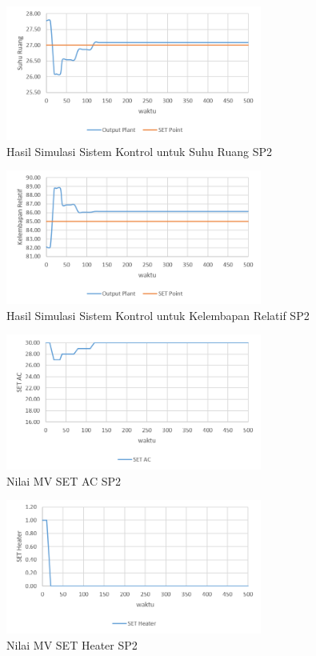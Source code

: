 \begin{figure}[!h]
	\centering
	\includegraphics[width=0.75\textwidth]{figures/SimulinkSP2Td}
	\caption{Hasil Simulasi Sistem Kontrol untuk Suhu Ruang SP2}
	\label{fig:5:SimulinkSP2Td}
\end{figure}

\begin{figure}[!h]
	\centering
	\includegraphics[width=0.75\textwidth]{figures/SimulinkSP2RH}
	\caption{Hasil Simulasi Sistem Kontrol untuk Kelembapan Relatif SP2}
	\label{fig:5:SimulinkSP2RH}
\end{figure}

\begin{figure}[!h]
	\centering
	\includegraphics[width=0.75\textwidth]{figures/SimulinkSP2AC}
	\caption{Nilai MV SET AC SP2}
	\label{fig:5:SimulinkSP2AC}
\end{figure}

\begin{figure}[!h]
	\centering
	\includegraphics[width=0.75\textwidth]{figures/SimulinkSP2HT}
	\caption{Nilai MV SET Heater SP2}
	\label{fig:5:SimulinkSP2HT}
\end{figure}

